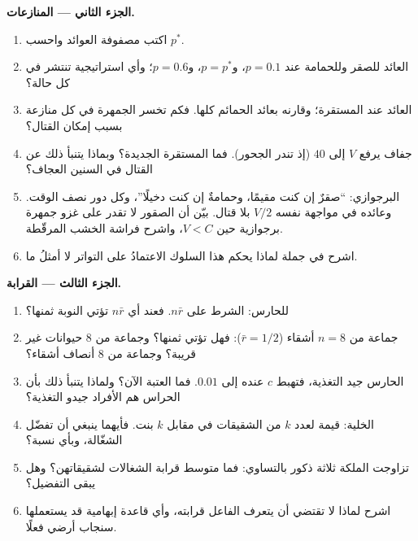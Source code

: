 \begin{problem}
\medskip
\noindent\textbf{الجزء الثاني --- المنازعات.}
\begin{enumerate}[resume]
  \item اكتب مصفوفة العوائد واحسب $p^{*}$.
  \item العائد للصقر وللحمامة عند $p = 0.1$، و$p = p^{*}$، و$p =
        0.6$؛ وأي استراتيجية تنتشر في كل حالة؟
  \item العائد عند المستقرة؛ وقارنه بعائد الحمائم كلها. فكم
        تخسر الجمهرة في كل منازعة بسبب إمكان القتال؟
  \item جفاف يرفع $V$ إلى $40$ (إذ تندر الجحور). فما المستقرة
        الجديدة؟ وبماذا يتنبأ ذلك عن القتال في السنين العجاف؟
  \item البرجوازي: ``صقرٌ إن كنت مقيمًا، وحمامةٌ إن كنت
        دخيلًا''، وكل دور نصف الوقت. وعائده في مواجهة نفسه
        $V/2$ بلا قتال. بيّن أن الصقور لا تقدر على غزو جمهرة
        برجوازية حين $V
        < C$، واشرح فراشة الخشب المرقّطة.
  \item اشرح في جملة لماذا يحكم هذا السلوك الاعتمادُ على
        التواتر لا أمثلُ ما.
\end{enumerate}

\medskip
\noindent\textbf{الجزء الثالث --- القرابة.}
\begin{enumerate}[resume]
  \item {} للحارس: الشرط على $n\bar r$. فعند أي
        $n\bar r$ تؤتي النوبة ثمنها؟
  \item جماعة من $n = 8$ أشقاء ($\bar r = 1/2$): فهل تؤتي
        ثمنها؟ وجماعة من 8 حيوانات غير قريبة؟ وجماعة من 8
        أنصاف أشقاء؟
  \item الحارس جيد التغذية، فتهبط $c$ عنده إلى $0.01$. فما
        العتبة الآن؟ ولماذا يتنبأ ذلك بأن الحراس هم الأفراد
        جيدو التغذية؟
  \item الخلية: قيمة  لعدد $k$ من الشقيقات في مقابل
        $k$ بنت. فأيهما ينبغي أن تفضّل الشغّالة، وبأي نسبة؟
  \item تزاوجت الملكة ثلاثة ذكور بالتساوي: فما متوسط قرابة
        الشغالات لشقيقاتهن؟ وهل يبقى التفضيل؟
  \item اشرح لماذا لا تقتضي  أن يتعرف الفاعل
        قرابته، وأي قاعدة إبهامية قد يستعملها سنجاب أرضي فعلًا.
\end{enumerate}


\end{problem}

